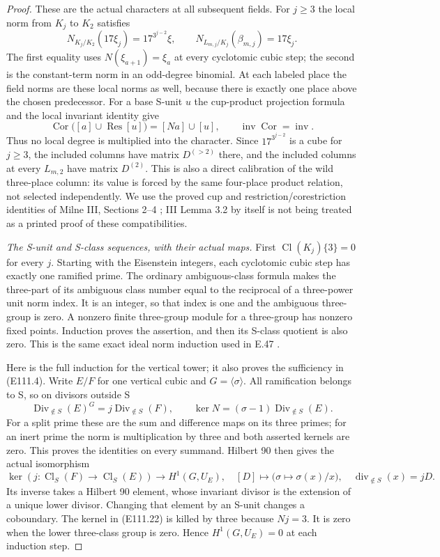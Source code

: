 \begin{proof}
These are the actual characters at all subsequent fields.
For $j\ge3$ the local norm from $K_j$ to $K_2$ satisfies
\[
 N_{K_j/K_2}(17\xi_j)=17^{3^{j-2}}\xi,
 \qquad N_{L_{m,j}/K_j}(\beta_{m,j})=17\xi_j.
 \tag{E111.19}
\]
The first equality uses $N(\xi_{a+1})=\xi_a$ at every
cyclotomic cubic step; the second is the constant-term
norm in an odd-degree binomial. At each labeled place
the field norms are these local norms as well, because
there is exactly one place above the chosen predecessor.
For a base S-unit $u$ the cup-product projection formula
and the local invariant identity give
\[
 \operatorname{Cor}\bigl([a]\cup\operatorname{Res}[u]\bigr)
       =[N a]\cup[u],\qquad
       \operatorname{inv}\operatorname{Cor}=\operatorname{inv}.
 \tag{E111.20}
\]
Thus no local degree is multiplied into the character.
Since $17^{3^{j-2}}$ is a cube for $j\ge3$, the included
columns have matrix $D^{(>2)}$ there, and the included
columns at every $L_{m,2}$ have matrix $D^{(2)}$.
This is also a direct calibration of the wild three-place
column: its value is forced by the same four-place
product relation, not selected independently.
We use the proved cup and restriction/corestriction
identities of Milne III, Sections 2--4
\cite{E_MilneCFT}; III Lemma 3.2 by itself is not being
treated as a printed proof of these compatibilities.

\emph{The S-unit and S-class sequences, with their actual maps.}
First $\operatorname{Cl}(K_j)\{3\}=0$ for every $j$.
Starting with the Eisenstein integers, each cyclotomic
cubic step has exactly one ramified prime. The ordinary
ambiguous-class formula makes the three-part of its
ambiguous class number equal to the reciprocal of a
three-power unit norm index. It is an integer, so that
index is one and the ambiguous three-group is zero.
A nonzero finite three-group module for a three-group
has nonzero fixed points. Induction proves the assertion,
and then its S-class quotient is also zero. This is the
same exact ideal norm induction used in E.47
\cite[Theorem 1 and its ideal proof]{E_LemmermeyerAmbiguous}.

Here is the full induction for the vertical tower; it
also proves the sufficiency in (E111.4). Write $E/F$ for
one vertical cubic and $G=\langle\sigma\rangle$.
All ramification belongs to S, so on divisors outside S
\[
 \operatorname{Div}_{\notin S}(E)^G
       =j\operatorname{Div}_{\notin S}(F),\qquad
 \ker N=(\sigma-1)\operatorname{Div}_{\notin S}(E).
 \tag{E111.21}
\]
For a split prime these are the sum and difference maps
on its three primes; for an inert prime the norm is
multiplication by three and both asserted kernels are
zero. This proves the identities on every summand.
Hilbert 90 then gives the actual isomorphism
\[
 \ker(j:\operatorname{Cl}_S(F)\to\operatorname{Cl}_S(E))
  \longrightarrow H^1(G,U_E),\quad
 [D]\longmapsto\bigl(\sigma\mapsto\sigma(x)/x\bigr),
 \quad \operatorname{div}_{\notin S}(x)=jD.
 \tag{E111.22}
\]
Its inverse takes a Hilbert 90 element, whose invariant
divisor is the extension of a unique lower divisor.
Changing that element by an S-unit changes a coboundary.
The kernel in (E111.22) is killed by three because
$Nj=3$. It is zero when the lower three-class group is
zero. Hence $H^1(G,U_E)=0$ at each induction step.


\end{proof}

